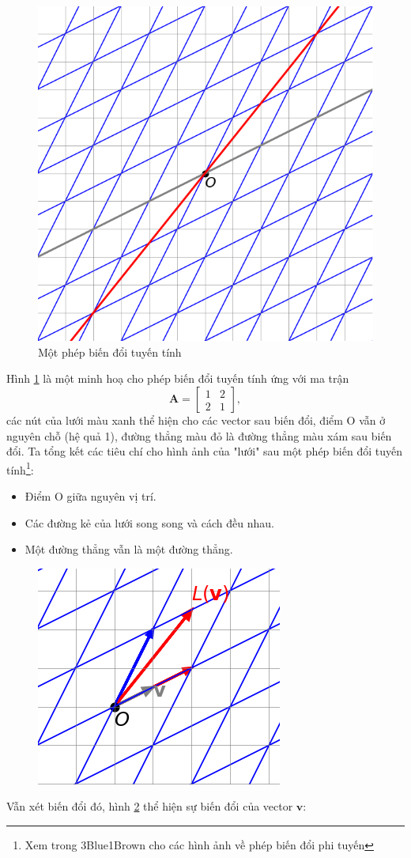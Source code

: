 \begin{figure}[H]
    \centering
    \includegraphics[width=0.5\linewidth]{Tuan2/Figures/LT1.png}
    \caption{Một phép biến đổi tuyến tính}
    \label{LT1}
\end{figure}
Hình \ref{LT1} là một minh hoạ cho phép biến đổi tuyến tính ứng với ma trận \[\mathbf{A}=\begin{bmatrix}
    1&2\\2&1
\end{bmatrix},\] các nút của lưới màu xanh thể hiện cho các vector sau biến đổi, điểm O vẫn ở nguyên chỗ (hệ quả 1), đường thẳng màu đỏ là đường thẳng màu xám sau biến đổi.
Ta tổng kết các tiêu chí cho hình ảnh của "lưới" sau một phép biến đổi tuyến tính\footnote{Xem trong 3Blue1Brown cho các hình ảnh về phép biến đổi phi tuyến}:
\begin{itemize}
    \item Điểm O giữa nguyên vị trí.
    \item Các đường kẻ của lưới song song và cách đều nhau.
    \item Một đường thẳng vẫn là một đường thẳng.
\end{itemize}
\begin{figure}[H]
    \centering
    \includegraphics[width=0.4\linewidth]{Tuan2/Figures/LT2.png}
    \caption{}
    \label{LT2}
\end{figure}
Vẫn xét biến đổi đó, hình \ref{LT2} thể hiện sự biến đổi của vector \(\mathbf{v}\):
